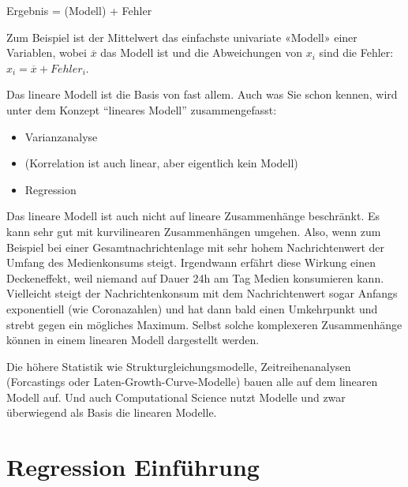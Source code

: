 \documentclass[
  10pt,
  letterpaper,
  a4paper, twoside]{scrreprt}
\providecommand{\tightlist}{%
  \setlength{\itemsep}{0pt}\setlength{\parskip}{0pt}}\usepackage{longtable,booktabs,array}
\begin{document}
\begin{tcolorbox}[enhanced jigsaw, coltitle=black, opacitybacktitle=0.6, toptitle=1mm, colbacktitle=quarto-callout-note-color!10!white, colback=white, toprule=.15mm, opacityback=0, bottomrule=.15mm, arc=.35mm, colframe=quarto-callout-note-color-frame, leftrule=.75mm, titlerule=0mm, breakable, left=2mm, rightrule=.15mm, title={Grundmodell}, bottomtitle=1mm]

Ergebnis = (Modell) + Fehler

Zum Beispiel ist der Mittelwert das einfachste univariate «Modell» einer
Variablen, wobei \(\overline{x}\) das Modell ist und die Abweichungen
von \(x_i\) sind die Fehler: \(x_i = \overline{x} + Fehler_i\).

\end{tcolorbox}

Das lineare Modell ist die Basis von fast allem. Auch was Sie schon
kennen, wird unter dem Konzept \enquote{lineares Modell}
zusammengefasst:

\begin{itemize}
\tightlist
\item
  Varianzanalyse
\item
  (Korrelation ist auch linear, aber eigentlich kein Modell)
\item
  Regression
\end{itemize}

Das lineare Modell ist auch nicht auf lineare Zusammenhänge beschränkt.
Es kann sehr gut mit kurvilinearen Zusammenhängen umgehen. Also, wenn
zum Beispiel bei einer Gesamtnachrichtenlage mit sehr hohem
Nachrichtenwert der Umfang des Medienkonsums steigt. Irgendwann erfährt
diese Wirkung einen Deckeneffekt, weil niemand auf Dauer 24h am Tag
Medien konsumieren kann. Vielleicht steigt der Nachrichtenkonsum mit dem
Nachrichtenwert sogar Anfangs exponentiell (wie Coronazahlen) und hat
dann bald einen Umkehrpunkt und strebt gegen ein mögliches Maximum.
Selbst solche komplexeren Zusammenhänge können in einem linearen Modell
dargestellt werden.

Die höhere Statistik wie Strukturgleichungsmodelle, Zeitreihenanalysen
(Forcastings oder Laten-Growth-Curve-Modelle) bauen alle auf dem
linearen Modell auf. Und auch Computational Science nutzt Modelle und
zwar überwiegend als Basis die linearen Modelle.

\section{Regression Einführung}\label{regression-einfuxfchrung}
\end{document}
